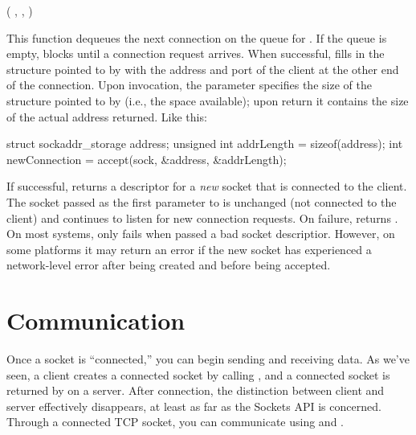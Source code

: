 \begin{inlinefcn}
 ( , 
, 
)
\end{inlinefcn}

This function dequeues the next connection on the queue for
.  If the queue is empty,  blocks
until a connection request arrives.  When successful,
 fills in the  structure
pointed to by  with the address and port
of the client at the other end of the connection.
Upon invocation, the  parameter specifies the 
size of the structure pointed to by  (i.e., the
space available); upon return it
contains the size of the actual address returned.
Like this:

\begin{inlinecode}
  struct sockaddr_storage address;
  unsigned int addrLength = sizeof(address);
  int newConnection = accept(sock, &address, &addrLength);
\end{inlinecode}

If successful,  returns a descriptor for a
\emph{new} socket that is connected to the client.  The socket passed as
the first parameter to  is unchanged (not
connected to the client) and continues to listen for new connection
requests.  On failure,  returns .
On most systems,  only fails when passed a bad socket
descriptior.  However, on some platforms it may return an
error if the new socket has experienced a network-level error after
being created and before being accepted.

\section{Communication}

Once a socket is ``connected,'' you can begin sending and receiving data. 
As we've seen, a client creates a connected socket by calling
, and a connected socket is returned by
 on a server.  After connection, the distinction
between client and server effectively disappears, at least as far as
the Sockets API is concerned.  Through a connected
TCP socket, you can communicate using  and
.

